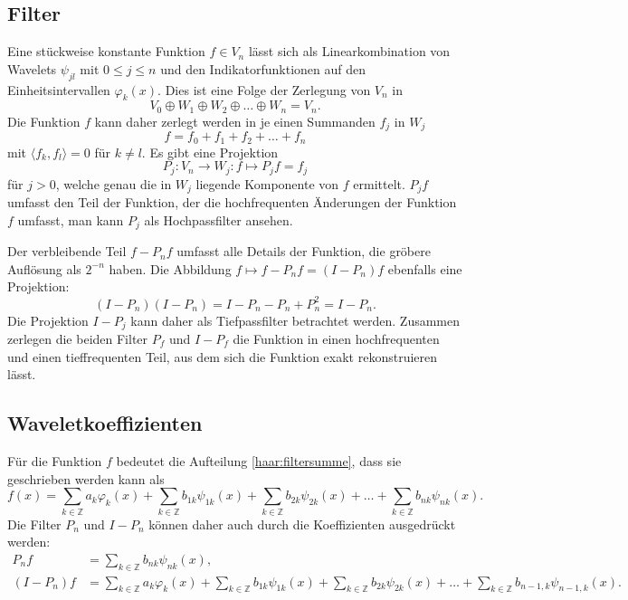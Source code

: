 \subsection{Filter}\label{haar:approximation:filter}
Eine stückweise konstante Funktion $f\in V_n$ lässt sich als Linearkombination
von Wavelets $\psi_{jl}$ mit $0\le j \le n$ und den Indikatorfunktionen
auf den Einheitsintervallen $\varphi_k(x)$. 
Dies ist eine Folge der Zerlegung von $V_n$ in
\begin{equation}
V_0 \oplus W_1 \oplus W_2 \oplus \dots \oplus W_n = V_n.
\label{haar:filtersumme}
\end{equation}
Die Funktion $f$ kann daher zerlegt werden in je einen Summanden $f_j$ in $W_j$
\[
f = f_0 + f_1 + f_2 + \dots + f_n
\]
mit $\langle f_k,f_l\rangle = 0$ für $k\ne l$.
Es gibt eine Projektion
\[
P_j \colon V_n \to W_j : f \mapsto P_jf = f_j
\]
für $j>0$, welche genau die in $W_j$ liegende Komponente von $f$ 
ermittelt.
$P_jf$ umfasst den Teil der Funktion, der die hochfrequenten Änderungen
der Funktion $f$ umfasst, man kann $P_j$ als Hochpassfilter ansehen.

Der verbleibende Teil $f-P_nf$ umfasst alle Details der Funktion, die
gröbere Auflösung als $2^{-n}$ haben.
Die Abbildung $f\mapsto f-P_nf = (I-P_n)f$ ebenfalls eine Projektion:
\[
(I-P_n)(I-P_n) = I -P_n - P_n + P_n^2 = I - P_n.
\]
Die Projektion $I-P_j$ kann daher als Tiefpassfilter betrachtet werden.
Zusammen zerlegen die beiden Filter $P_f$ und $I-P_f$ die Funktion
in einen hochfrequenten und einen tieffrequenten Teil, aus dem sich
die Funktion exakt rekonstruieren lässt.

\subsection{Waveletkoeffizienten}
Für die Funktion $f$ bedeutet die Aufteilung \eqref{haar:filtersumme},
dass sie geschrieben werden kann als
\[
f(x)
=
\sum_{k\in\mathbb Z} a_k\varphi_k(x)
+
\sum_{k\in\mathbb Z} b_{1k}\psi_{1k}(x)
+
\sum_{k\in\mathbb Z} b_{2k}\psi_{2k}(x)
+
\dots
+
\sum_{k\in\mathbb Z} b_{nk}\psi_{nk}(x).
\]
Die Filter $P_n$ und $I-P_n$ können daher auch durch die Koeffizienten
ausgedrückt werden:
\begin{align*}
P_nf 
&=
\sum_{k\in\mathbb Z} b_{nk}\psi_{nk}(x),
\\
(I-P_n)f
&=
\sum_{k\in\mathbb Z} a_k\varphi_k(x)
+
\sum_{k\in\mathbb Z} b_{1k}\psi_{1k}(x)
+
\sum_{k\in\mathbb Z} b_{2k}\psi_{2k}(x)
+
\dots
+
\sum_{k\in\mathbb Z} b_{n-1,k}\psi_{n-1,k}(x).
\end{align*}


